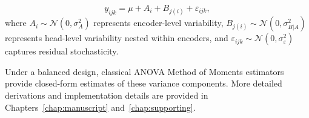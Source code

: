 \begin{equation}
y_{ijk} = \mu + A_i + B_{j(i)} + \varepsilon_{ijk},
\end{equation}
where $A_i \sim \mathcal{N}(0,\sigma_A^2)$ represents encoder-level variability, $B_{j(i)} \sim \mathcal{N}(0,\sigma_{B|A}^2)$ represents head-level variability nested within encoders, and $\varepsilon_{ijk} \sim \mathcal{N}(0,\sigma_\varepsilon^2)$ captures residual stochasticity.

Under a balanced design, classical ANOVA Method of Moments estimators provide closed-form estimates of these variance components. More detailed derivations and implementation details are provided in Chapters~\ref{chap:manuscript} and~\ref{chap:supporting}.